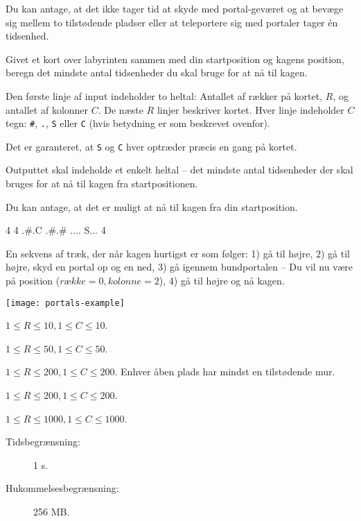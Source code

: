 \documentclass{boi2014-dk}
\newcommand{\constant}[1]{{\tt #1}}
\begin{document}
    Du kan antage, at det ikke tager tid at skyde med portal-geværet og at
    bevæge sig mellem to tilstødende pladser eller at teleportere sig med
    portaler tager én tidsenhed.

    \Task
    Givet et kort over labyrinten sammen med din startposition og kagens
    position, beregn det mindste antal tidsenheder du skal bruge for at nå til
    kagen.

    \Input
    Den første linje af input indeholder to heltal: Antallet af rækker på
    kortet, $R$, og antallet af kolonner $C$. De næste $R$ linjer beskriver
    kortet. Hver linje indeholder $C$ tegn: \constant{\#},
    \constant{.}, \constant{S} eller \constant{C} (hvis betydning er som beskrevet
    ovenfor).

    Det er garanteret, at \constant{S} og \constant{C} hver optræder præcis en
    gang på kortet.

    \Output
    Outputtet skal indeholde et enkelt heltal -- det mindste antal tidsenheder
    der skal bruges for at nå til kagen fra startpositionen.

    Du kan antage, at det er muligt at nå til kagen fra din startposition.

    \Example
    \example
    {
        4 4\newline
        .\#.C\newline
        .\#.\#\newline
        ....\newline
        S...
    }
    {
        4
    }
    {
        En sekvens af træk, der når kagen hurtigst er som følger: 1) gå til
        højre, 2) gå til højre, skyd en portal op og en ned, 3) gå igennem
        bundportalen -- Du vil nu være på position ($række = 0, kolonne = 2$),
        4) gå til højre og nå kagen.

        \begin{center}
            \texttt{[image: portals-example]}
        \end{center}
    }

    \Scoring

    \begin{description}[leftmargin=0pt]
        \item[Delopgave 1 (11 point):] $1 \le R \le 10, 1 \le C \le 10$.
        \item[Delopgave 2 (20 point):] $1 \le R \le 50, 1 \le C \le 50$.
        \item[Delopgave 3 (20 point):] $1 \le R \le 200, 1 \le C \le 200$.
            Enhver åben plads har mindst en tilstødende mur.
        \item[Delopgave 4 (19 point):] $1 \le R \le 200, 1 \le C \le 200$.
        \item[Delopgave 5 (30 point):] $1 \le R \le 1000, 1 \le C \le 1000$.
    \end{description}

    \Constraints

    \begin{description}
        \item[Tidsbegrænsning:] 1 s.
        \item[Hukommelsesbegrænsning:] 256 MB.
    \end{description}
\end{document}
